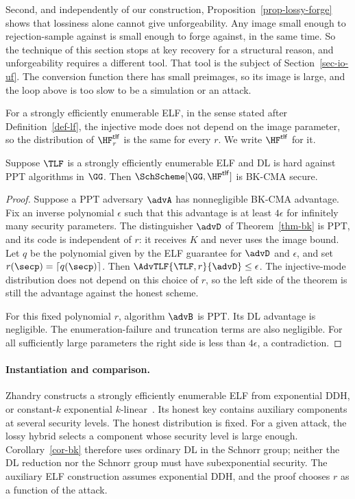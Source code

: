 Second, and independently of our construction, Proposition~\ref{prop-lossy-forge} shows that lossiness alone cannot give unforgeability. Any image small enough to rejection-sample against is small enough to forge against, in the same time. So the technique of this section stops at key recovery for a structural reason, and unforgeability requires a different tool. That tool is the subject of Section~\ref{sec-io-uf}. The conversion function there has small preimages, so its image is large, and the loop above is too slow to be a simulation or an attack.

For a strongly efficiently enumerable ELF, in the sense stated after Definition~\ref{def-lf}, the injective mode does not depend on the image parameter, so the distribution of $\HF^{\mathsf{tlf}}_r$ is the same for every $r$. We write $\HF^{\mathsf{tlf}}$ for it.

\begin{corollary} \label{cor-bk}
Suppose $\TLF$ is a strongly efficiently enumerable ELF and DL is hard against PPT algorithms in $\GG$. Then $\SchScheme[\GG,\HF^{\mathsf{tlf}}]$ is BK-CMA secure.
\end{corollary}

\begin{proof}
Suppose a PPT adversary $\advA$ has nonnegligible BK-CMA advantage. Fix an inverse polynomial $\epsilon$ such that this advantage is at least $4\epsilon$ for infinitely many security parameters. The distinguisher $\advD$ of Theorem~\ref{thm-bk} is PPT, and its code is independent of $r$: it receives $K$ and never uses the image bound. Let $q$ be the polynomial given by the ELF guarantee for $\advD$ and $\epsilon$, and set $r(\secp)=\lceil q(\secp)\rceil$. Then $\AdvTLF{\TLF,r}{\advD}\le\epsilon$. The injective-mode distribution does not depend on this choice of $r$, so the left side of the theorem is still the advantage against the honest scheme.

For this fixed polynomial $r$, algorithm $\advB$ is PPT. Its DL advantage is negligible. The enumeration-failure and truncation terms are also negligible. For all sufficiently large parameters the right side is less than $4\epsilon$, a contradiction.
\end{proof}

\paragraph*{Instantiation and comparison.} Zhandry constructs a strongly efficiently enumerable ELF from exponential DDH, or constant-$k$ exponential $k$-linear~\cite{C:Zhandry16}. Its honest key contains auxiliary components at several security levels. The honest distribution is fixed. For a given attack, the lossy hybrid selects a component whose security level is large enough. Corollary~\ref{cor-bk} therefore uses ordinary DL in the Schnorr group; neither the DL reduction nor the Schnorr group must have subexponential security. The auxiliary ELF construction assumes exponential DDH, and the proof chooses $r$ as a function of the attack.

